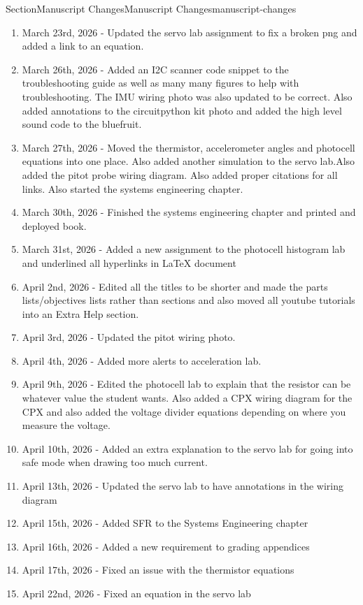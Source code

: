 \documentclass[oneside,10pt,]{book}
\numberwithin{equation}{section}
\begin{document}
\begin{sectionptx}{Section}{Manuscript Changes}{}{Manuscript Changes}{}{}{manuscript-changes}
\begin{enumerate}
\item{}March 23rd, 2026 - Updated the servo lab assignment to fix a broken png and added a link to an equation.%
\item{}March 26th, 2026 - Added an I2C scanner code snippet to the troubleshooting guide as well as many many figures to help with troubleshooting. The IMU wiring photo was also updated to be correct. Also added annotations to the circuitpython kit photo and added the high level sound code to the bluefruit.%
\item{}March 27th, 2026 - Moved the thermistor, accelerometer angles and photocell equations into one place. Also added another simulation to the servo lab.Also added the pitot probe wiring diagram. Also added proper citations for all links. Also started the systems engineering chapter.%
\item{}March 30th, 2026 - Finished the systems engineering chapter and printed and deployed book.%
\item{}March 31st, 2026 - Added a new assignment to the photocell histogram lab and underlined all hyperlinks in LaTeX document%
\item{}April 2nd, 2026 - Edited all the titles to be shorter and made the parts lists\slash{}objectives lists rather than sections and also moved all youtube tutorials into an Extra Help section.%
\item{}April 3rd, 2026 - Updated the pitot wiring photo.%
\item{}April 4th, 2026 - Added more alerts to acceleration lab.%
\item{}April 9th, 2026 - Edited the photocell lab to explain that the resistor can be whatever value the student wants. Also added a CPX wiring diagram for the CPX and also added the voltage divider equations depending on where you measure the voltage.%
\item{}April 10th, 2026 - Added an extra explanation to the servo lab for going into safe mode when drawing too much current.%
\item{}April 13th, 2026 - Updated the servo lab to have annotations in the wiring diagram%
\item{}April 15th, 2026 - Added SFR to the Systems Engineering chapter%
\item{}April 16th, 2026 - Added a new requirement to grading appendices%
\item{}April 17th, 2026 - Fixed an issue with the thermistor equations%
\item{}April 22nd, 2026 - Fixed an equation in the servo lab%

\end{enumerate}
\end{sectionptx}
\end{document}
